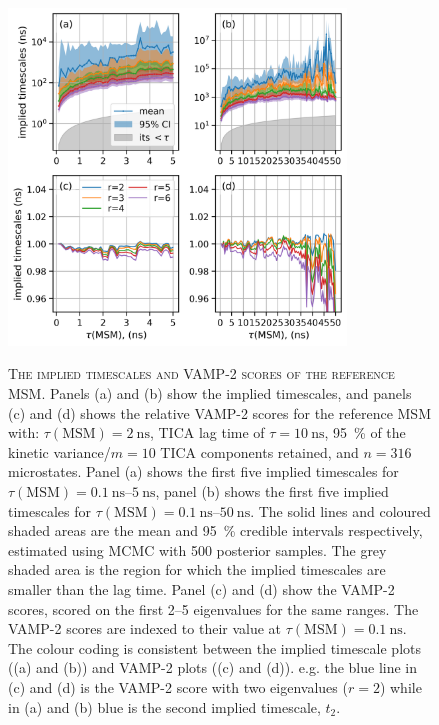 \begin{figure}[ht!]
 \centering
    \caption[The implied timescales and VAMP-2 scores of the sensitivity reference MSM]{\textsc{The implied timescales and VAMP-2 scores of the reference MSM}. Panels (a) and (b) show the implied timescales, and panels (c) and (d) shows the relative VAMP-2 scores for the reference MSM with: $\tau(\textrm{MSM})=\SI{2}{\nano\second}$, TICA lag time of $\tau=\SI{10}{\nano\second}$, \SI{95}{\percent} of the kinetic variance/$m=10$ TICA components retained, and $n=316$ microstates. Panel (a) shows the first five implied timescales for $\tau(\mathrm{MSM})=\SIrange[range-phrase=--]{0.1}{5}{\nano\second}$, panel (b) shows the first five implied timescales for $\tau(\mathrm{MSM}) = \SIrange[range-phrase]{0.1}{50}{\nano\second}$. The solid lines and coloured shaded areas are the mean and \SI{95}{\percent} credible intervals respectively, estimated using MCMC with \num{500} posterior samples. The grey shaded area is the region for which the implied timescales are smaller than the lag time. Panel (c) and (d) show the VAMP-2 scores, scored on the first \numrange{2}{5} eigenvalues for the same ranges. The VAMP-2 scores are indexed to their value at $\tau(\mathrm{MSM})=\SI{0.1}{\nano\second}$. The colour coding is consistent between the implied timescale plots ((a) and (b)) and VAMP-2 plots ((c) and (d)). e.g. the blue line in (c) and (d) is the VAMP-2 score with two eigenvalues ($r=2$) while in (a) and (b) blue is the second implied timescale, $t_{2}$.}
 \includegraphics[width=0.8\textwidth]{chapters/aadh/figures/implied_timescales_D_sens.png}
 \label{fig:its_d_sens}
\end{figure}

